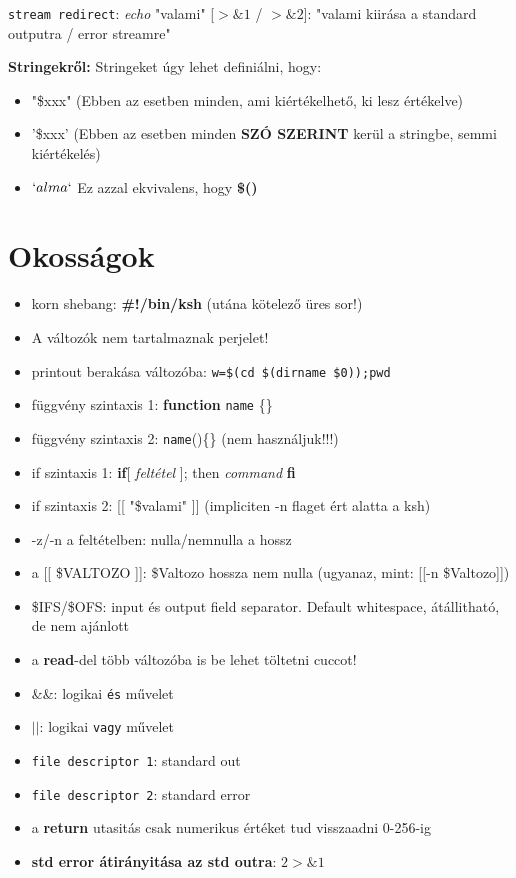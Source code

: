 \documentclass{article}
\begin{document}
\texttt{stream redirect}: \textit{echo} "valami" [$>\&1$ / $>\&2$]: "valami kiirása a standard outputra / error streamre" 

\textbf{Stringekről:} Stringeket úgy lehet definiálni, hogy:
\begin{itemize}
	\item "\$xxx" (Ebben az esetben minden, ami kiértékelhető, ki lesz értékelve)
	\item '\$xxx' (Ebben az esetben minden \textbf{SZÓ SZERINT} kerül a stringbe, semmi kiértékelés)
	\item $`alma`$ Ez azzal ekvivalens, hogy \textbf{\$()}
\end{itemize}


\newpage
\section{Okosságok}
\begin{itemize}
	\item korn shebang: \textbf{\#!/bin/ksh} (utána kötelező üres sor!)
	\item A változók nem tartalmaznak perjelet!
	\item printout berakása változóba: \texttt{w=\$(cd \$(dirname \$0));pwd}
	\item függvény szintaxis 1: \textbf{function} \texttt{name} \{\}
	\item függvény szintaxis 2: \texttt{name}()\{\} (nem használjuk!!!)
	\item if szintaxis 1: \textbf{if}[ \textit{feltétel} ]; then \textit{command} \textbf{fi}
	\item if szintaxis 2: [[ "\$valami" ]] (impliciten -n flaget ért alatta a ksh)
	\item -z/-n a feltételben: nulla/nemnulla a hossz
	\item a [[ \$VALTOZO ]]: \$Valtozo hossza nem nulla (ugyanaz, mint: [[-n \$Valtozo]])
	\item \$IFS/\$OFS: input és output field separator. Default whitespace, átállitható, de nem ajánlott
	\item a \textbf{read}-del több változóba is be lehet töltetni cuccot!
	\item \&\&: logikai \texttt{és} művelet
	\item $||$: logikai \texttt{vagy} művelet
	\item \texttt{file descriptor 1}: standard out
	\item \texttt{file descriptor 2}: standard error
	\item a \textbf{return} utasitás csak numerikus értéket tud visszaadni 0-256-ig
	\item \textbf{std error átirányitása az std outra}: \textit{$2>\&1$}
	
\end{itemize}
\end{document}
